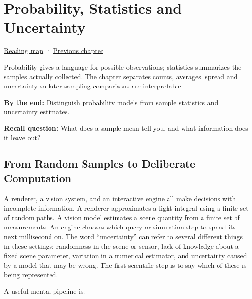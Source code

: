 \chapter{Probability, Statistics and Uncertainty}\label{03-visual-computing-i-ch012-probability-statistics-and-uncertainty}\hypertarget{03-visual-computing-i-ch012}{}\label{stagechapter:03-visual-computing-i-ch012}

\hypertarget{03-visual-computing-i-ch012-probability-statistics-and-uncertainty}{}

\hyperref[volume-reading-map]{Reading map} · \hyperref[02-foundations-ii-ch031]{Previous chapter}

Probability gives a language for possible observations; statistics summarizes the samples actually collected. The chapter separates counts, averages, spread and uncertainty so later sampling comparisons are interpretable.

\textbf{By the end:} Distinguish probability models from sample statistics and uncertainty estimates.

\textbf{Recall question:} What does a sample mean tell you, and what information does it leave out?

\section{From Random Samples to Deliberate Computation}\label{03-visual-computing-i-ch012-from-random-samples-to-deliberate-computation}

\hypertarget{03-visual-computing-i-ch012-from-random-samples-to-deliberate-computation}{}

A renderer, a vision system, and an interactive engine all make decisions with incomplete information. A renderer approximates a light integral using a finite set of random paths. A vision model estimates a scene quantity from a finite set of measurements. An engine chooses which query or simulation step to spend its next millisecond on. The word ``uncertainty'' can refer to several different things in these settings: randomness in the scene or sensor, lack of knowledge about a fixed scene parameter, variation in a numerical estimator, and uncertainty caused by a model that may be wrong. The first scientific step is to say which of these is being represented.

A useful mental pipeline is:


